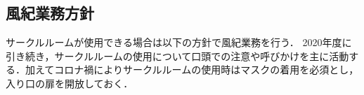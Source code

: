 \subsection*{風紀業務方針}


サークルルームが使用できる場合は以下の方針で風紀業務を行う．
2020年度に引き続き，サークルルームの使用について口頭での注意や呼びかけを主に活動する．加えてコロナ禍によりサークルルームの使用時はマスクの着用を必須とし，入り口の扉を開放しておく．
